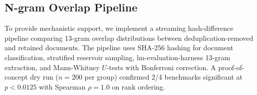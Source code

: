 \subsection{N-gram Overlap Pipeline}

To provide mechanistic support, we implement a streaming hash-difference pipeline
comparing 13-gram overlap distributions between deduplication-removed and retained
documents. The pipeline uses SHA-256 hashing for document classification, stratified
reservoir sampling, lm-evaluation-harness 13-gram extraction, and Mann-Whitney
$U$-tests with Bonferroni correction. A proof-of-concept dry run ($n = 200$ per group)
confirmed 2/4 benchmarks significant at $p < 0.0125$ with Spearman $\rho = 1.0$ on rank ordering.
